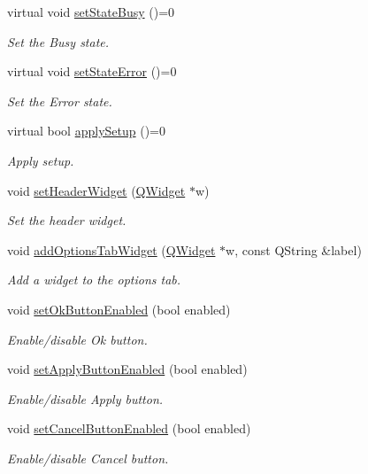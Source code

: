 \begin{DoxyCompactItemize}
virtual void \hyperlink{classmdt_abstract_port_setup_dialog_ae69fe60533e2df56f790e2522bb81592}{set\-State\-Busy} ()=0
\begin{DoxyCompactList}\small\item\em Set the Busy state. \end{DoxyCompactList}\item 
virtual void \hyperlink{classmdt_abstract_port_setup_dialog_a7cd081326d0935ea06d617b821795bb9}{set\-State\-Error} ()=0
\begin{DoxyCompactList}\small\item\em Set the Error state. \end{DoxyCompactList}\item 
virtual bool \hyperlink{classmdt_abstract_port_setup_dialog_ab090cd4da49eb9f2f1fc2f507bdb9717}{apply\-Setup} ()=0
\begin{DoxyCompactList}\small\item\em Apply setup. \end{DoxyCompactList}\item 
void \hyperlink{classmdt_abstract_port_setup_dialog_ab01700b5a09fc1b6c5f6f62e77148b43}{set\-Header\-Widget} (\hyperlink{class_q_widget}{Q\-Widget} $\ast$w)
\begin{DoxyCompactList}\small\item\em Set the header widget. \end{DoxyCompactList}\item 
void \hyperlink{classmdt_abstract_port_setup_dialog_ad21fb0a1f6f2c175d12fa066c4f3f5a9}{add\-Options\-Tab\-Widget} (\hyperlink{class_q_widget}{Q\-Widget} $\ast$w, const Q\-String \&label)
\begin{DoxyCompactList}\small\item\em Add a widget to the options tab. \end{DoxyCompactList}\item 
void \hyperlink{classmdt_abstract_port_setup_dialog_a19f18be7722d2437dbab87b7a568b216}{set\-Ok\-Button\-Enabled} (bool enabled)
\begin{DoxyCompactList}\small\item\em Enable/disable Ok button. \end{DoxyCompactList}\item 
void \hyperlink{classmdt_abstract_port_setup_dialog_a4fa65cf9827a81bf501008ced33b69ab}{set\-Apply\-Button\-Enabled} (bool enabled)
\begin{DoxyCompactList}\small\item\em Enable/disable Apply button. \end{DoxyCompactList}\item 
void \hyperlink{classmdt_abstract_port_setup_dialog_a7a63a08869469615f5be2c10fd490641}{set\-Cancel\-Button\-Enabled} (bool enabled)
\begin{DoxyCompactList}\small\item\em Enable/disable Cancel button. \end{DoxyCompactList}\end{DoxyCompactItemize}

